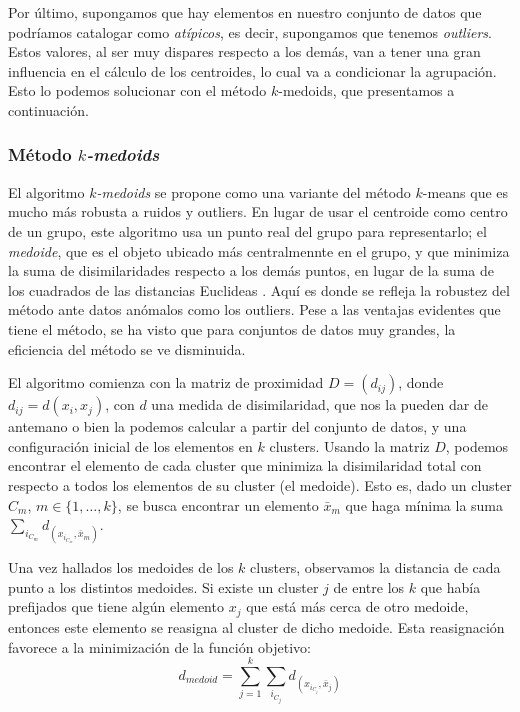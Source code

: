 Por último, supongamos que hay elementos en nuestro conjunto de datos que podríamos catalogar como \textit{atípicos}, es decir, supongamos que tenemos \textit{outliers}. Estos valores, al 
ser muy dispares respecto a los demás, van a tener una gran influencia en el cálculo de los centroides, lo cual va a condicionar la agrupación. Esto lo podemos solucionar con el 
método $k$-medoids, que presentamos a continuación.

\subsubsection{Método \textit{$k$-medoids}}

El algoritmo \textit{$k$-medoids} se propone como una variante del método $k$-means que es mucho más robusta a ruidos y outliers. En lugar de 
usar el centroide como centro de un grupo, este algoritmo usa un punto real del grupo para representarlo; el \textit{medoide}, que es el objeto ubicado
más centralmennte en el grupo, y que minimiza la suma de disimilaridades respecto a los demás puntos, en lugar de la suma de los cuadrados de las distancias Euclideas \cite{kmedoids}. Aquí es donde
se refleja la robustez del método ante datos anómalos como los outliers. Pese a las ventajas evidentes que tiene el método, se ha visto que para conjuntos de 
datos muy grandes, la eficiencia del método se ve disminuida. \newline

El algoritmo comienza con la matriz de proximidad $D = (d_{ij})$, donde $d_{ij} = d(x_{i},x_{j})$, con $d$ una medida de disimilaridad, que nos la pueden dar de antemano o
bien la podemos calcular a partir del conjunto de datos, y una configuración inicial de los elementos en $k$ clusters. Usando la matriz $D$, podemos encontrar el elemento de 
cada cluster que minimiza la disimilaridad total con respecto a todos los elementos de su cluster (el medoide). Esto es, dado un cluster $C_{m}$, $m\in\{1,\dots,k\}$, se busca encontrar
un elemento $\bar{x}_{m}$ que haga mínima la suma $\sum_{i_{C_{m}}}d_(x_{i_{C_{m}}},\bar{x}_{m})$. \newline

Una vez hallados los medoides de los $k$ clusters, observamos la distancia de cada punto a los distintos medoides. Si existe un cluster $j$ de entre los $k$ que había prefijados que 
tiene algún elemento $x_{j}$ que está más cerca de otro medoide, entonces este elemento se reasigna al cluster de dicho medoide. Esta reasignación favorece a la minimización de la función
objetivo:
\[
d_{medoid} = \sum_{j=1}^{k}\sum_{i_{C_{j}}}d_(x_{i_{C_{j}}},\bar{x}_{j})
\]

